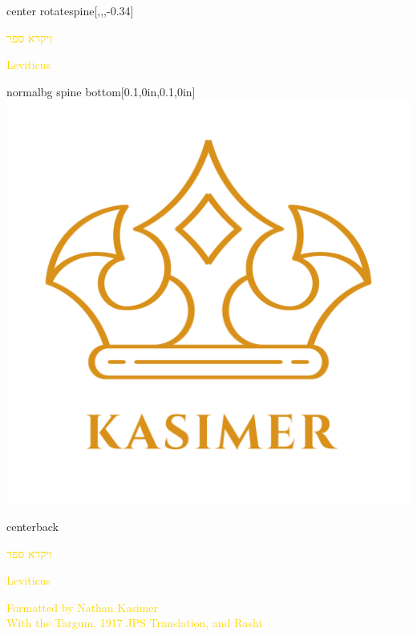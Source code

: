 \documentclass[
coverheight=9.93in,%
coverwidth=7.565in,%
spinewidth=.688in,
bleedwidth=.75in,
marklength=0in,
12pt,
pagecolor=darkblue,
trimmed
]{bookcover}
\newcommand{\hebtext}[1]{
\begin{hebrew}
	#1
\end{hebrew}
}
\begin{document}
	\begin{bookcover}
	\begin{bookcoverelement}{center rotate}{spine}[,,,-0.34\coverheight]
		\LARGE\textcolor{gold}{\hebtext{ויקרא ספר} \space Leviticus }
	\end{bookcoverelement}
	\begin{bookcoverelement}{normal}{bg spine bottom}[0.1\spinewidth,0in,0.1\spinewidth,0in]
	\includegraphics[width=0.8\spinewidth,height=0.8\spinewidth]{kasimer_logo.png}
	\end{bookcoverelement}

	\begin{bookcoverelement}{center}{back}
		\begin{Huge}
			\textcolor{gold}{\hebtext{ויקרא ספר}}
			
			\textcolor{gold}{Leviticus}
	
		\end{Huge}
		\vspace{2\baselineskip}
		\begin{large}
			\textcolor{gold}{Formatted by Nathan Kasimer\\With the Targum, 1917 JPS Translation, and Rashi}
		\end{large}
	\end{bookcoverelement}
	\end{bookcover}
	
\end{document}
